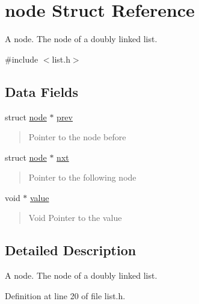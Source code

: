 \hypertarget{structnode}{}\section{node Struct Reference}
\label{structnode}


A node. The node of a doubly linked list.  




{\ttfamily \#include $<$list.\+h$>$}

\subsection*{Data Fields}
\begin{DoxyCompactItemize}
\item 
struct \hyperlink{structnode}{node} $\ast$ \hyperlink{structnode_a530843171ca1a6e033bac999737cb184}{prev}
\begin{DoxyCompactList}\small\item\em \begin{quote}
Pointer to the node before \end{quote}
\end{DoxyCompactList}\item 
struct \hyperlink{structnode}{node} $\ast$ \hyperlink{structnode_a745e59ece59d43566f37915138c7aee3}{nxt}
\begin{DoxyCompactList}\small\item\em \begin{quote}
Pointer to the following node \end{quote}
\end{DoxyCompactList}\item 
void $\ast$ \hyperlink{structnode_a0f61d63b009d0880a89c843bd50d8d76}{value}
\begin{DoxyCompactList}\small\item\em \begin{quote}
Void Pointer to the value \end{quote}
\end{DoxyCompactList}\end{DoxyCompactItemize}


\subsection{Detailed Description}
A node. The node of a doubly linked list. 

Definition at line 20 of file list.\+h.



